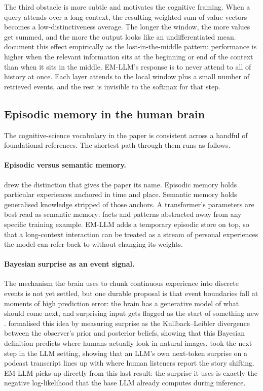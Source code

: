 The third obstacle is more subtle and motivates the cognitive framing. When a query attends over a long context, the resulting weighted sum of value vectors becomes a low-distinctiveness average. The longer the window, the more values get summed, and the more the output looks like an undifferentiated mean. \textcite{liu2024lostmiddle} document this effect empirically as the lost-in-the-middle pattern: performance is higher when the relevant information sits at the beginning or end of the context than when it sits in the middle. EM-LLM's response is to never attend to all of history at once. Each layer attends to the local window plus a small number of retrieved events, and the rest is invisible to the softmax for that step.

\subsection{Episodic memory in the human brain}
\label{sec:episodic}

The cognitive-science vocabulary in the paper is consistent across a handful of foundational references. The shortest path through them runs as follows.

\paragraph{Episodic versus semantic memory.}
\textcite{tulving1972episodic} drew the distinction that gives the paper its name. Episodic memory holds particular experiences anchored in time and place. Semantic memory holds generalised knowledge stripped of those anchors. A transformer's parameters are best read as semantic memory: facts and patterns abstracted away from any specific training example. EM-LLM adds a temporary episodic store on top, so that a long-context interaction can be treated as a stream of personal experiences the model can refer back to without changing its weights.

\paragraph{Bayesian surprise as an event signal.}
The mechanism the brain uses to chunk continuous experience into discrete events is not yet settled, but one durable proposal is that event boundaries fall at moments of high prediction error: the brain has a generative model of what should come next, and surprising input gets flagged as the start of something new \cite{zacks2007event}. \textcite{itti2009bayesian} formalised this idea by measuring surprise as the Kullback--Leibler divergence between the observer's prior and posterior beliefs, showing that this Bayesian definition predicts where humans actually look in natural images. \textcite{kumar2023neural} took the next step in the LLM setting, showing that an LLM's own next-token surprise on a podcast transcript lines up with where human listeners report the story shifting. EM-LLM picks up directly from this last result: the surprise it uses is exactly the negative log-likelihood that the base LLM already computes during inference.

